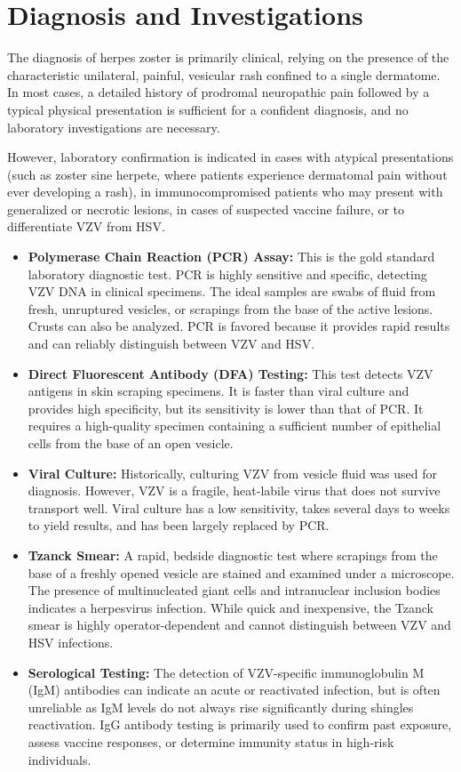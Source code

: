\section*{Diagnosis and Investigations}
The diagnosis of herpes zoster is primarily clinical, relying on the presence of the characteristic unilateral, painful, vesicular rash confined to a single dermatome. In most cases, a detailed history of prodromal neuropathic pain followed by a typical physical presentation is sufficient for a confident diagnosis, and no laboratory investigations are necessary.

However, laboratory confirmation is indicated in cases with atypical presentations (such as zoster sine herpete, where patients experience dermatomal pain without ever developing a rash), in immunocompromised patients who may present with generalized or necrotic lesions, in cases of suspected vaccine failure, or to differentiate VZV from HSV.

\begin{itemize}
    \item \textbf{Polymerase Chain Reaction (PCR) Assay:} This is the gold standard laboratory diagnostic test. PCR is highly sensitive and specific, detecting VZV DNA in clinical specimens. The ideal samples are swabs of fluid from fresh, unruptured vesicles, or scrapings from the base of the active lesions. Crusts can also be analyzed. PCR is favored because it provides rapid results and can reliably distinguish between VZV and HSV.
    \item \textbf{Direct Fluorescent Antibody (DFA) Testing:} This test detects VZV antigens in skin scraping specimens. It is faster than viral culture and provides high specificity, but its sensitivity is lower than that of PCR. It requires a high-quality specimen containing a sufficient number of epithelial cells from the base of an open vesicle.
    \item \textbf{Viral Culture:} Historically, culturing VZV from vesicle fluid was used for diagnosis. However, VZV is a fragile, heat-labile virus that does not survive transport well. Viral culture has a low sensitivity, takes several days to weeks to yield results, and has been largely replaced by PCR.
    \item \textbf{Tzanck Smear:} A rapid, bedside diagnostic test where scrapings from the base of a freshly opened vesicle are stained and examined under a microscope. The presence of multinucleated giant cells and intranuclear inclusion bodies indicates a herpesvirus infection. While quick and inexpensive, the Tzanck smear is highly operator-dependent and cannot distinguish between VZV and HSV infections.
    \item \textbf{Serological Testing:} The detection of VZV-specific immunoglobulin M (IgM) antibodies can indicate an acute or reactivated infection, but is often unreliable as IgM levels do not always rise significantly during shingles reactivation. IgG antibody testing is primarily used to confirm past exposure, assess vaccine responses, or determine immunity status in high-risk individuals.
\end{itemize}

